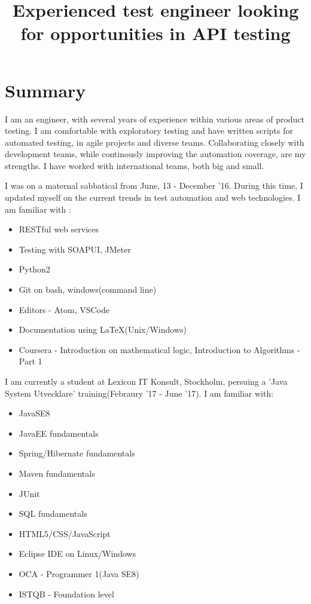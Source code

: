 \documentclass[12pt,a4paper,sans]{moderncv} %
\title{Experienced test engineer looking for opportunities in API testing}
\begin{document}
\makecvtitle

\section{Summary}
I am an engineer, with several years of experience within various areas of product testing. I am comfortable with exploratory testing and have written scripts for automated testing, in
agile projects and diverse teams. Collaborating closely with development teams, while continously improving the automation coverage, are my strengths.
I have worked with international teams, both big and small.

\hfill \break
I was on a maternal sabbatical from June, 13 - December '16. During this time, I updated myself on the current trends in test automation and web technologies. I am
familiar with :

	\begin{itemize}
	\item RESTful web services
	\item Testing with SOAPUI, JMeter 
	\item Python2
	\item Git on bash, windows(command line)
	\item Editors - Atom, VSCode
	\item Documentation using LaTeX(Unix/Windows)
	\item Coursera - Introduction on mathematical logic, Introduction to Algorithms - Part 1
	\end{itemize}	
	
\hfill \break
I am currently a student at Lexicon IT Konsult, Stockholm, persuing a 'Java System Utvecklare' training(Febraury '17 - June '17). I am familiar with:

	\begin{itemize}
	\item JavaSE8
	\item JavaEE fundamentals
	\item Spring/Hibernate fundamentals
	\item Maven fundamentals
	\item JUnit
	\item SQL fundamentals
	\item HTML5/CSS/JavaScript
	\item Eclipse IDE on Linux/Windows
	\item OCA - Programmer 1(Java SE8)
	\item ISTQB - Foundation level
 	\end{itemize}
\end{document}
